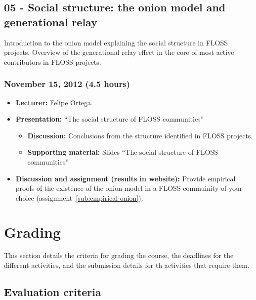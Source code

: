 \documentclass[a4paper]{article}
\begin{document}
\subsection{05 - Social structure: the onion model and generational relay}

Introduction to the onion model explaining the social structure in FLOSS projects. Overview of the generational relay effect in the core of most active contributors in FLOSS projects.

\subsubsection{November 15, 2012 (4.5 hours)}

\begin{itemize}
\item \textbf{Lecturer:} Felipe Ortega.
\item \textbf{Presentation:} ``The social structure of FLOSS communities''
  \begin{itemize}
  \item \textbf{Discussion:} Conclusions from the structure identified in FLOSS projects.
  \item \textbf{Supporting material:} Slides ``The social structure of FLOSS communities''
  \end{itemize}
\item \textbf{Discussion and assignment (results in website):} Provide empirical proofs of the existence of the onion model in a FLOSS commuinity of your choice (assignment~\ref{sub:empirical-onion}).

\end{itemize}

\section{Grading}

This section details the criteria for grading the course, the deadlines for the different activities, and the submission details for th activities that require them.

\subsection{Evaluation criteria}
\label{sub:evaluation-criteria}
\end{document}
